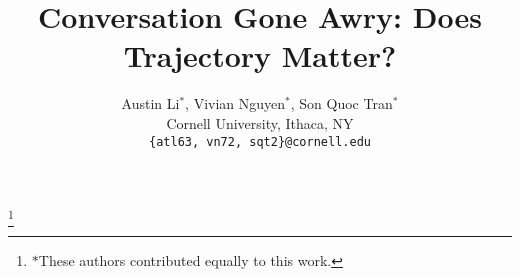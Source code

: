 \documentclass[11pt]{article}
\title{Conversation Gone Awry: Does Trajectory Matter?}
\author{Austin Li$^*$, Vivian Nguyen$^*$, Son Quoc Tran$^*$\\
Cornell University, Ithaca, NY\\
\texttt{\{atl63, vn72, sqt2\}@cornell.edu}}
\newcommand\nnfootnote[1]{%
  \begin{NoHyper}
  \renewcommand\thefootnote{}\footnote{#1}%
  \addtocounter{footnote}{-1}%
  \end{NoHyper}
}
\begin{document}
\maketitle
\nnfootnote{$*$\quad These authors contributed equally to this work.}












%


\appendix
\end{document}
